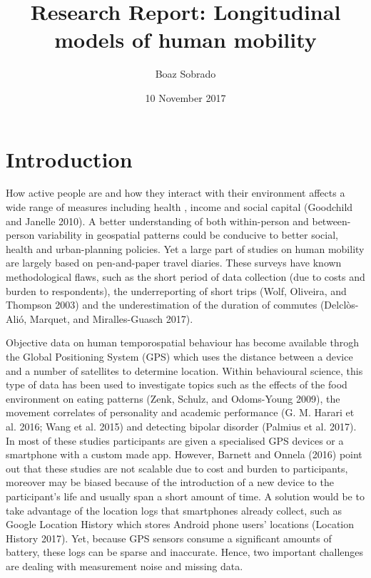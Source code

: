 \documentclass[]{article}
\title{Research Report: Longitudinal models of human mobility}
\author{Boaz Sobrado}
\date{10 November 2017}
\begin{document}
\maketitle

\section{Introduction}\label{introduction}

How active people are and how they interact with their environment
affects a wide range of measures including health , income and social
capital (Goodchild and Janelle 2010). A better understanding of both
within-person and between-person variability in geospatial patterns
could be conducive to better social, health and urban-planning policies.
Yet a large part of studies on human mobility are largely based on
pen-and-paper travel diaries. These surveys have known methodological
flaws, such as the short period of data collection (due to costs and
burden to respondents), the underreporting of short trips (Wolf,
Oliveira, and Thompson 2003) and the underestimation of the duration of
commutes (Delclòs-Alió, Marquet, and Miralles-Guasch 2017).

Objective data on human temporospatial behaviour has become available
throgh the Global Positioning System (GPS) which uses the distance
between a device and a number of satellites to determine location.
Within behavioural science, this type of data has been used to
investigate topics such as the effects of the food environment on eating
patterns (Zenk, Schulz, and Odoms-Young 2009), the movement correlates
of personality and academic performance (G. M. Harari et al. 2016; Wang
et al. 2015) and detecting bipolar disorder (Palmius et al. 2017). In
most of these studies participants are given a specialised GPS devices
or a smartphone with a custom made app. However, Barnett and Onnela
(2016) point out that these studies are not scalable due to cost and
burden to participants, moreover may be biased because of the
introduction of a new device to the participant's life and usually span
a short amount of time. A solution would be to take advantage of the
location logs that smartphones already collect, such as Google Location
History which stores Android phone users' locations (Location History
2017). Yet, because GPS sensors consume a significant amounts of
battery, these logs can be sparse and inaccurate. Hence, two important
challenges are dealing with measurement noise and missing data.
\end{document}
